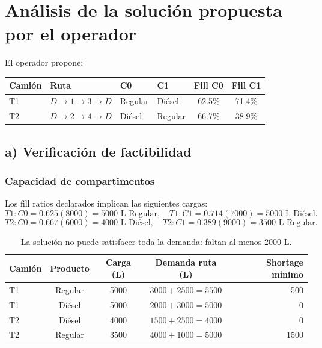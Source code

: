 \documentclass[11pt,letterpaper]{article}
\begin{document}
\section{Análisis de la solución propuesta por el operador}

El operador propone:

\begin{table}[h]
\centering
\begin{tabular}{llllcc}
\toprule
\textbf{Camión} & \textbf{Ruta} & \textbf{C0} & \textbf{C1} & \textbf{Fill C0} & \textbf{Fill C1} \\
\midrule
T1 & \(D\to1\to3\to D\) & Regular & Diésel & 62.5\% & 71.4\% \\
T2 & \(D\to2\to4\to D\) & Diésel & Regular & 66.7\% & 38.9\% \\
\bottomrule
\end{tabular}
\end{table}

\subsection{a) Verificación de factibilidad}

\subsubsection*{Capacidad de compartimentos}

Los fill ratios declarados implican las siguientes cargas:
\[
T1:C0=0.625(8000)=5000\text{ L Regular},\quad
T1:C1=0.714(7000)=5000\text{ L Diésel}.
\]
\[
T2:C0=0.667(6000)=4000\text{ L Diésel},\quad
T2:C1=0.389(9000)=3500\text{ L Regular}.
\]

\begin{table}[h]
\centering
\begin{tabular}{lcccr}
\toprule
\textbf{Camión} & \textbf{Producto} & \textbf{Carga (L)} & \textbf{Demanda ruta (L)} & \textbf{Shortage mínimo} \\
\midrule
T1 & Regular & 5000 & \(3000+2500=5500\) & 500 \\
T1 & Diésel & 5000 & \(2000+3000=5000\) & 0 \\
T2 & Diésel & 4000 & \(1500+2500=4000\) & 0 \\
T2 & Regular & 3500 & \(4000+1000=5000\) & 1500 \\
\bottomrule
\end{tabular}
\caption{La solución no puede satisfacer toda la demanda: faltan al menos 2000 L.}
\end{table}
\end{document}
